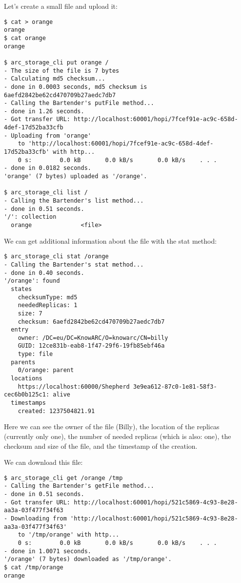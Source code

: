 \documentclass{book}
\begin{document}
Let's create a small file and upload it:

\begin{verbatim}
$ cat > orange
orange
$ cat orange 
orange

$ arc_storage_cli put orange /
- The size of the file is 7 bytes
- Calculating md5 checksum...
- done in 0.0003 seconds, md5 checksum is 6aefd2842be62cd470709b27aedc7db7
- Calling the Bartender's putFile method...
- done in 1.26 seconds.
- Got transfer URL: http://localhost:60001/hopi/7fcef91e-ac9c-658d-4def-17d52ba33cfb
- Uploading from 'orange'
    to 'http://localhost:60001/hopi/7fcef91e-ac9c-658d-4def-17d52ba33cfb' with http...
    0 s:        0.0 kB       0.0 kB/s       0.0 kB/s    . . .       
- done in 0.0182 seconds.
'orange' (7 bytes) uploaded as '/orange'.

$ arc_storage_cli list /
- Calling the Bartender's list method...
- done in 0.51 seconds.
'/': collection
  orange              <file>

\end{verbatim}

We can get additional information about the file with the stat method:

\begin{verbatim}
$ arc_storage_cli stat /orange
- Calling the Bartender's stat method...
- done in 0.40 seconds.
'/orange': found
  states
    checksumType: md5
    neededReplicas: 1
    size: 7
    checksum: 6aefd2842be62cd470709b27aedc7db7
  entry
    owner: /DC=eu/DC=KnowARC/O=knowarc/CN=billy
    GUID: 12ce831b-eab8-1f47-29f6-19fb85ebf46a
    type: file
  parents
    0/orange: parent
  locations
    https://localhost:60000/Shepherd 3e9ea612-87c0-1e81-58f3-cec6b0b125c1: alive
  timestamps
    created: 1237504821.91
\end{verbatim}

Here we can see the owner of the file (Billy), the location of the replicas (currently only one), the number of needed replicas (which is also: one), the checksum and size of the file, and the timestamp of the creation.

We can download this file:

\begin{verbatim}
$ arc_storage_cli get /orange /tmp
- Calling the Bartender's getFile method...
- done in 0.51 seconds.
- Got transfer URL: http://localhost:60001/hopi/521c5869-4c93-8e28-aa3a-03f477f34f63
- Downloading from 'http://localhost:60001/hopi/521c5869-4c93-8e28-aa3a-03f477f34f63'
    to '/tmp/orange' with http...
    0 s:        0.0 kB       0.0 kB/s       0.0 kB/s    . . .       
- done in 1.0071 seconds.
'/orange' (7 bytes) downloaded as '/tmp/orange'.
$ cat /tmp/orange 
orange
\end{verbatim}
\end{document}
